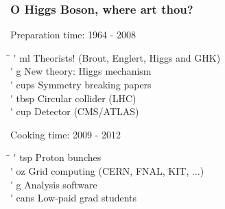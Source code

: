 \documentclass[xcolor={usenames,dvipsnames,svgnames,table}]{beamer}
\begin{document}
\begin{frame}
 \titlepage
\end{frame}

\begin{frame}
	\frametitle{O Higgs Boson, where art thou?}
	\centering \textcolor{color1}{Preparation time: 1964 - 2008}
	\begin{tabbing}
		\hspace{1cm}\=\hspace{1cm}\=\kill
		\'{} ml \> Theorists! (Brout, Englert, Higgs and GHK) \\
		\'{} g \> New theory: Higgs mechanism\\
		\'{} cups Symmetry breaking papers\\
		\'{} tbsp \> Circular collider (LHC)\\
		\'{} cup \> Detector (CMS/ATLAS)\\
	\end{tabbing}
	\centering \textcolor{color1}{Cooking time: 2009 - 2012}
	\begin{tabbing}
		\hspace{1cm}\=\hspace{1cm}\=\kill
		\'{} tsp \> Proton bunches\\
		\'{} oz \> Grid computing (CERN, FNAL, KIT, ...)\\
		\'{} g \> Analysis software \\
		\'{} cans \> Low-paid grad students\\
	\end{tabbing}
\end{frame}
\end{document}
